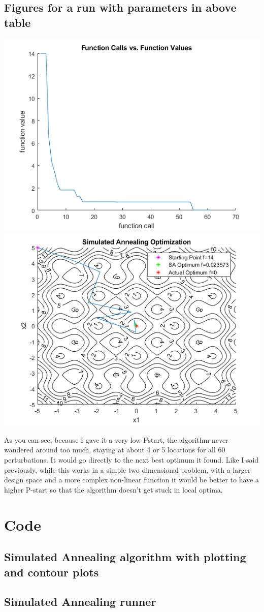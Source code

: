 \documentclass[a4paper]{article}
\begin{document}
    \subsection{Figures for a run with parameters in above table}
    \begin{center}
        \includegraphics[scale = 0.7]{images/CallsVsValues.png}
        \includegraphics[scale = 0.7]{images/SimulatedAnnealingOptimization.png}
    \end{center}

    
    As you can see, because I gave it a very low Pstart, the algorithm never wandered around too much, staying at about 4 or 5 locations for all 60 perturbations. It would go directly to the next best optimum it found. 
    Like I said previously, while this works in a simple two dimensional problem, with a larger design space and a more complex non-linear function it would be better to have a higher P-start so that the algorithm doesn't get stuck in local optima.
    \section{Code}
    \subsection{Simulated Annealing algorithm with plotting and contour plots}
    
    \subsection{Simulated Annealing runner}
    
    
\end{document}

